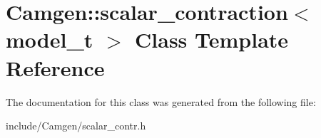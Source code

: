 \hypertarget{a00497}{}\section{Camgen\+:\+:scalar\+\_\+contraction$<$ model\+\_\+t $>$ Class Template Reference}
\label{a00497}


The documentation for this class was generated from the following file\+:\begin{DoxyCompactItemize}
\item 
include/\+Camgen/scalar\+\_\+contr.\+h\end{DoxyCompactItemize}
